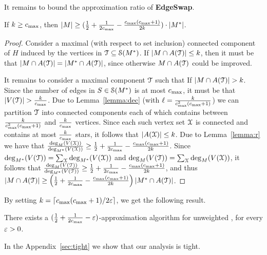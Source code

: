 \fi %

It remains to bound the approximation ratio of \textbf{EdgeSwap}.

\begin{lemma}
If $k \geq c_{\max}$, then $\left| M \right| \geq (\frac{1}{2} + \frac{1}{2c_{\max}}
- \frac{c_{\max}(c_{\max}+1)}{2k}) \cdot \left| M^* \right|$.
\end{lemma}
\begin{proof}
Consider a maximal (with respect to set inclusion) connected component
of $H$ induced by the vertices in $\mathcal{T} \subseteq \mathcal{S}(M^*)$.
%
If $\left| M \cap A(\mathcal{T}) \right| \leq k$, then it must be that $\left| M \cap
A(\mathcal{T}) \right| = \left| M^* \cap A(\mathcal{T}) \right|$, since otherwise $M \cap
A(\mathcal{T})$ could be improved.

It remains to consider a maximal component $\mathcal{T}$ such that If
$\left| M \cap A(\mathcal{T}) \right| > k$.  Since the number of edges in
$S \in \mathcal{S}(M^*)$ is at most $c_{\max}$, it must be that $\left| V(\mathcal{T}) \right|
> \frac{k}{c_{\max}}$.
%
Due to Lemma~\ref{lemma:dec} (with $\ell
= \frac{k}{c_{\max}^2(c_{\max}+1)}$) we can partition $\mathcal{T}$ into connected
components each of which contains between $\frac{k}{c_{\max}^2(c_{\max}+1)}$
and $\frac{k}{c_{\max}}$ vertices.
%
Since each such vertex set $\mathcal{X}$ is connected and contains at most
$\frac{k}{c_{\max}}$ stars, it follows that $\left| A(\mathcal{X}) \right| \leq k$.
%
Due to Lemma~\ref{lemma:r} we have that
\(
\frac{\deg_M(V(\mathcal{X}))}{\deg_{M^*}(V(\mathcal{X}))} 
\geq \frac{1}{2} + \frac{1}{2c_{\max}} - \frac{c_{\max}(c_{\max}+1)}{2k}
\).
Since $\deg_{M^*}(V(\mathcal{T})) = \sum_{\mathcal{X}} \deg_{M^*}(V(\mathcal{X}))$ and
$\deg_M(V(\mathcal{T})) = \sum_{\mathcal{X}} \deg_M(V(\mathcal{X}))$, it follows that
\(
\frac{\deg_M(V(\mathcal{T}))}{\deg_{M^*}(V(\mathcal{T}))}
\geq \frac{1}{2} + \frac{1}{2c_{\max}} - \frac{c_{\max}(c_{\max}+1)}{2k}
\),
and thus
\(
\left| M \cap A(\mathcal{T}) \right|
\geq \left(  \frac{1}{2} + \frac{1}{2c_{\max}} -
             \frac{c_{\max}(c_{\max}+1)}{2k} \right) \left| M^* \cap A(\mathcal{T}) \right|
\).
\end{proof}

By setting $k = \left\lceil c_{\max}(c_{\max}+1)/2\varepsilon \right\rceil$, we get the following
result.

\begin{corollary}
\label{cor:local}
There exists a $(\frac{1}{2} + \frac{1}{2c_{\max}} - \varepsilon)$-approximation algorithm
for unweighted \carpool, for every $\varepsilon>0$.
\end{corollary}

In the Appendix~\ref{sec:tight} we show that our analysis is tight.
